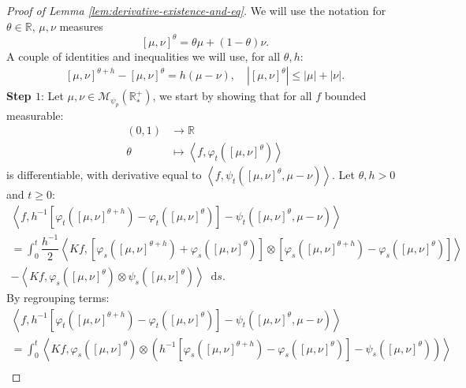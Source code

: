 \documentclass[11pt,a4paper]{article}
\newcommand{\RR}{\mathbb{R}}
\newcommand{\RRP}{\mathbb{R}^+_*}
\newcommand{\MC}{\mathcal{M}}
\newcommand{\brac}[1]{\left\langle#1\right\rangle}
\newcommand{\dd}{\mathop{}\!\mathrm{d}}
\begin{document}
\begin{proof}[Proof of Lemma \ref{lem:derivative-existence-and-eq}]
    We will use the notation for $\theta \in \RR$, $\mu,\nu $ measures 
    \[
    \left[\mu,\nu \right]^\theta = \theta\mu + (1-\theta)\nu.
    \]
    A couple of identities and inequalities we will use, for all $\theta, h$:
    \begin{align*}
        \left[\mu,\nu \right]^{\theta+h} - \left[\mu,\nu \right]^{\theta} = h(\mu - \nu),\quad \left|\left[\mu,\nu \right]^{\theta}\right| \leq |\mu| + |\nu|.
    \end{align*}
    \textbf{Step $1$}: Let $\mu,\nu \in \MC_{\psi_{p}}(\RRP)$, we start by showing that for all $f$ bounded measurable:
    \begin{align*}
        (0,1) &\to \RR \\
        \theta &\mapsto \brac{f,\varphi_t\left(\left[\mu,\nu \right]^\theta\right)}
    \end{align*}
    is differentiable, with derivative equal to $\brac{f,\psi_t\left(\left[\mu,\nu \right]^\theta,\mu-\nu\right)}$. Let $\theta,h > 0$ and $t \geq 0$:
    \begin{multline*}
        \brac{f,h^{-1}\left[\varphi_t\left(\left[\mu,\nu \right]^{\theta+h} \right) - \varphi_t\left(\left[\mu,\nu \right]^{\theta} \right) \right] - \psi_t\left(\left[\mu,\nu \right]^\theta,\mu-\nu\right)} \\
        = \int_0^t \dfrac{h^{-1}}{2}\brac{Kf,\left[\varphi_s\left(\left[\mu,\nu \right]^{\theta+h} \right) + \varphi_s\left(\left[\mu,\nu \right]^{\theta} \right)\right]\otimes \left[\varphi_s\left(\left[\mu,\nu \right]^{\theta+h} \right) - \varphi_s\left(\left[\mu,\nu \right]^{\theta} \right)\right]} \\
        - \brac{Kf,\varphi_s\left(\left[\mu,\nu \right]^{\theta}\right)\otimes \psi_s\left(\left[\mu,\nu \right]^{\theta}\right) }\dd s.
    \end{multline*}
    By regrouping terms:
    \begin{multline*}
        \brac{f,h^{-1}\left[\varphi_t\left(\left[\mu,\nu \right]^{\theta+h} \right) - \varphi_t\left(\left[\mu,\nu \right]^{\theta} \right) \right] - \psi_t\left(\left[\mu,\nu \right]^\theta,\mu-\nu\right)} \\
        = \int_0^t \brac{Kf,\varphi_s\left(\left[\mu,\nu \right]^{\theta} \right)\otimes \left(h^{-1}\left[\varphi_s\left(\left[\mu,\nu \right]^{\theta+h} \right) - \varphi_s\left(\left[\mu,\nu \right]^{\theta} \right)\right] - \psi_s\left(\left[\mu,\nu \right]^{\theta}\right)\right)} \\

\end{multline*}
\end{proof}
\end{document}
